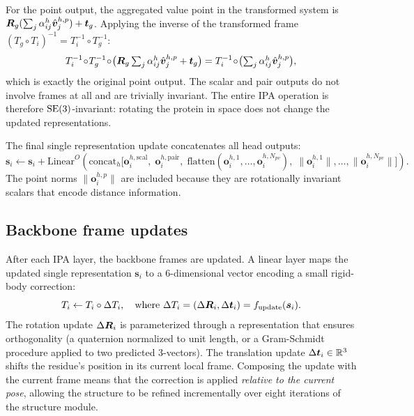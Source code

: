For the point output, the aggregated value point in the transformed system is $\bm{R}_g (\sum_j \alpha_{ij}^h \hat{\bm{v}}_j^{h,p}) + \bm{t}_g$.
Applying the inverse of the transformed frame $(T_g \circ T_i)^{-1} = T_i^{-1} \circ T_g^{-1}$:
\begin{equation}
\label{eq:ipa-invariance-output}
T_i^{-1} \!\circ\! T_g^{-1} \!\circ\! \bigl(\bm{R}_g \textstyle\sum_j \alpha_{ij}^h \hat{\bm{v}}_j^{h,p} + \bm{t}_g\bigr)
= T_i^{-1} \!\circ\! \bigl(\textstyle\sum_j \alpha_{ij}^h \hat{\bm{v}}_j^{h,p}\bigr),
\end{equation}
which is exactly the original point output.
The scalar and pair outputs do not involve frames at all and are trivially invariant.
The entire IPA operation is therefore $\mathrm{SE}(3)$-invariant: rotating the protein in space does not change the updated representations.

The final single representation update concatenates all head outputs:
\begin{equation}
\label{eq:ipa-final}
\bm{s}_i \leftarrow \bm{s}_i + \text{Linear}^O\!\left(
\text{concat}_{h}\!\bigl[
\bm{o}_i^{h,\text{scal}},\;
\bm{o}_i^{h,\text{pair}},\;
\text{flatten}(\bm{o}_i^{h,1}, \ldots, \bm{o}_i^{h,N_{pv}}),\;
\bigl\|\bm{o}_i^{h,1}\bigr\|, \ldots, \bigl\|\bm{o}_i^{h,N_{pv}}\bigr\|
\bigr]
\right).
\end{equation}
The point norms $\|\bm{o}_i^{h,p}\|$ are included because they are rotationally invariant scalars that encode distance information.

\subsection*{Backbone frame updates}
\label{sec:af2-backbone-update}

After each IPA layer, the backbone frames are updated.
A linear layer maps the updated single representation $\bm{s}_i$ to a 6-dimensional vector encoding a small rigid-body correction:
\begin{equation}
\label{eq:frame-update}
T_i \leftarrow T_i \circ \Delta T_i, \quad \text{where } \Delta T_i = (\Delta\bm{R}_i, \Delta\bm{t}_i) = f_\text{update}(\bm{s}_i).
\end{equation}
The rotation update $\Delta\bm{R}_i$ is parameterized through a representation that ensures orthogonality (a quaternion normalized to unit length, or a Gram-Schmidt procedure applied to two predicted 3-vectors).
The translation update $\Delta\bm{t}_i \in \mathbb{R}^3$ shifts the residue's position in its current local frame.
Composing the update with the current frame means that the correction is applied \emph{relative to the current pose}, allowing the structure to be refined incrementally over eight iterations of the structure module.


